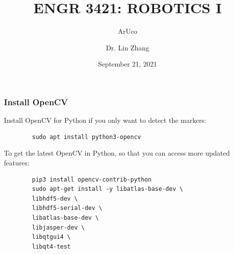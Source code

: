 \documentclass[12pt,letterpaper]{beamer}
\title[Robotics I]
{ENGR 3421: ROBOTICS I}
\subtitle{ArUco}
\author[Zhang, Lin]
{Dr. Lin Zhang}
\institute[UCA] %
{
  Department of Physics and Astronomy\\
  University of Central Arkansas
}
\date[Robotics1 2021] %
{September 21, 2021}
\begin{document}
\frame{\titlepage}



\begin{frame}[fragile]
\frametitle{Install OpenCV}

Install OpenCV for Python if you only want to detect the markers:
{\scriptsize
    \begin{verbatim}
        sudo apt install python3-opencv
    \end{verbatim}
}

To get the latest OpenCV in Python, so that you can access more updated features:
{\scriptsize
    \begin{verbatim}
        pip3 install opencv-contrib-python 
        sudo apt-get install -y libatlas-base-dev \
        libhdf5-dev \
        libhdf5-serial-dev \
        libatlas-base-dev \
        libjasper-dev \
        libqtgui4 \
        libqt4-test
    \end{verbatim}
}
\end{frame}
\end{document}
